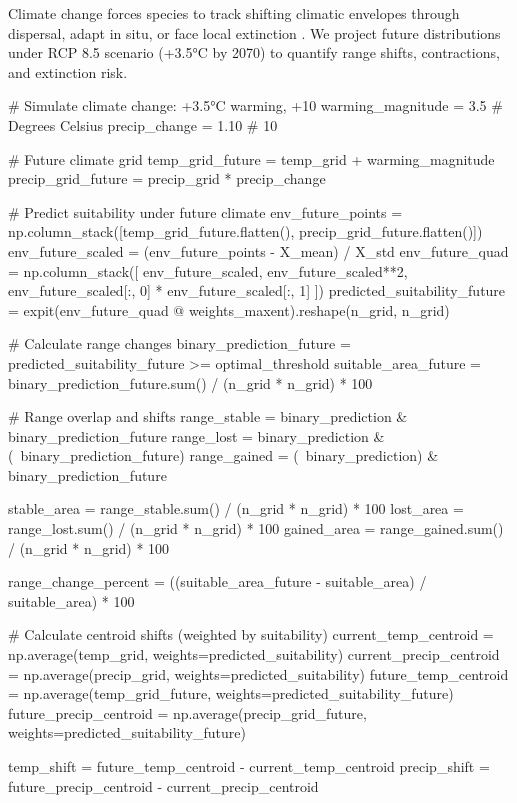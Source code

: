 \documentclass[11pt,a4paper]{article}
\begin{document}
Climate change forces species to track shifting climatic envelopes through dispersal, adapt in situ, or face local extinction \cite{thomas2004extinction}. We project future distributions under RCP 8.5 scenario (+3.5°C by 2070) to quantify range shifts, contractions, and extinction risk.

\begin{pycode}
# Simulate climate change: +3.5°C warming, +10%
warming_magnitude = 3.5  # Degrees Celsius
precip_change = 1.10  # 10%

# Future climate grid
temp_grid_future = temp_grid + warming_magnitude
precip_grid_future = precip_grid * precip_change

# Predict suitability under future climate
env_future_points = np.column_stack([temp_grid_future.flatten(),
                                     precip_grid_future.flatten()])
env_future_scaled = (env_future_points - X_mean) / X_std
env_future_quad = np.column_stack([
    env_future_scaled,
    env_future_scaled**2,
    env_future_scaled[:, 0] * env_future_scaled[:, 1]
])
predicted_suitability_future = expit(env_future_quad @ weights_maxent).reshape(n_grid, n_grid)

# Calculate range changes
binary_prediction_future = predicted_suitability_future >= optimal_threshold
suitable_area_future = binary_prediction_future.sum() / (n_grid * n_grid) * 100

# Range overlap and shifts
range_stable = binary_prediction & binary_prediction_future
range_lost = binary_prediction & (~binary_prediction_future)
range_gained = (~binary_prediction) & binary_prediction_future

stable_area = range_stable.sum() / (n_grid * n_grid) * 100
lost_area = range_lost.sum() / (n_grid * n_grid) * 100
gained_area = range_gained.sum() / (n_grid * n_grid) * 100

range_change_percent = ((suitable_area_future - suitable_area) / suitable_area) * 100

# Calculate centroid shifts (weighted by suitability)
current_temp_centroid = np.average(temp_grid, weights=predicted_suitability)
current_precip_centroid = np.average(precip_grid, weights=predicted_suitability)
future_temp_centroid = np.average(temp_grid_future, weights=predicted_suitability_future)
future_precip_centroid = np.average(precip_grid_future, weights=predicted_suitability_future)

temp_shift = future_temp_centroid - current_temp_centroid
precip_shift = future_precip_centroid - current_precip_centroid


\end{pycode}
\end{document}
